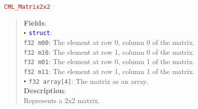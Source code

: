 \documentclass[a4paper,oneside,8pt]{extarticle}
\newcommand{\union}[1]{
  \noindent\textcolor{red}{\texttt{#1}}
  \vspace{-0.3em}
}
\renewcommand{\dot}{\raisebox{0.3ex}{\scalebox{0.6}{$\bullet$}}}
\theoremstyle{definition}
\begin{document}
\union{CML\_Matrix2x2}
\begin{quote}
  \textbf{Fields}: \\
  $\dot$ \textcolor{blue}{\texttt{struct}}: \\
  \indent\hspace{1em} \texttt{f32 m00}: The element at row 0, column 0 of the matrix. \\
  \indent\hspace{1em} \texttt{f32 m10}: The element at row 1, column 0 of the matrix. \\
  \indent\hspace{1em} \texttt{f32 m01}: The element at row 0, column 1 of the matrix. \\
  \indent\hspace{1em} \texttt{f32 m11}: The element at row 1, column 1 of the matrix. \\
  $\dot$ \texttt{f32 array[4]}: The matrix as an array. \\

  \vspace{-0.75em}
  \textbf{Description}: \\
  Represents a 2x2 matrix. \\
\end{quote}
\end{document}
